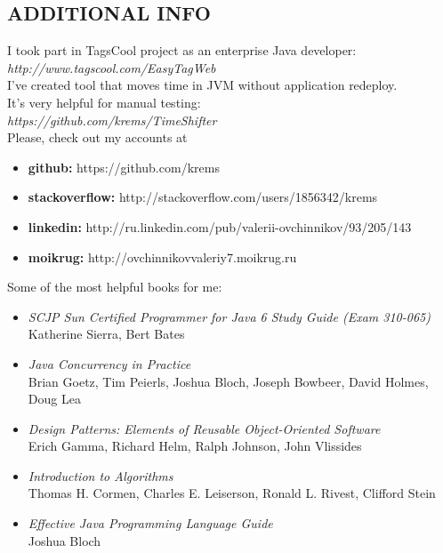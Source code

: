 \documentclass[margin,12pt]{res}
\begin{document}
\begin{resume}
\section{ADDITIONAL INFO}
I took part in TagsCool project as an enterprise Java developer:\\
\textit{http://www.tagscool.com/EasyTagWeb}\\
I've created tool that moves time in JVM without application redeploy.\\
It's very helpful for manual testing:\\
\textit{https://github.com/krems/TimeShifter}\\
Please, check out my accounts at\\
\begin{itemize} \itemsep -10pt
  \item \textbf{github:} https://github.com/krems\\
  \item \textbf{stackoverflow:} http://stackoverflow.com/users/1856342/krems\\
  \item \textbf{linkedin:} http://ru.linkedin.com/pub/valerii-ovchinnikov/93/205/143\\
  \item \textbf{moikrug:} http://ovchinnikovvaleriy7.moikrug.ru
\end{itemize}
Some of the most helpful books for me:\\
\begin{itemize} \itemsep -5pt
\item \textit{SCJP Sun Certified Programmer for Java 6 Study Guide
  (Exam 310-065)}\\ Katherine Sierra, Bert Bates\\
\item \textit{Java Concurrency in Practice}\\ Brian Goetz, Tim Peierls,
  Joshua Bloch, Joseph Bowbeer, David Holmes, Doug Lea\\
\item \textit{Design Patterns: Elements of Reusable Object-Oriented
  Software}\\ Erich Gamma, Richard Helm, Ralph Johnson, John Vlissides\\
\item \textit{Introduction to Algorithms}\\ Thomas H. Cormen, Charles
  E. Leiserson, Ronald L. Rivest, Clifford Stein\\
\item \textit{Effective Java Programming Language Guide}\\ Joshua Bloch\\
\end{itemize}
\end{resume}
\end{document}
